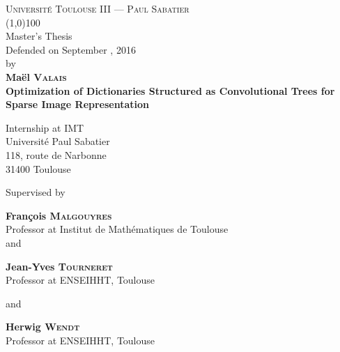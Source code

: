 \begin{titlepage}
\thispagestyle{titlepage}
\begin{center}
\textsc{Université Toulouse III — Paul Sabatier}\\
\vspace{0.5 cm}
\line(1,0){100}\\
\vspace{0.6 cm}
{{{Master's Thesis}}}\\
\vspace{0.3cm}
Defended on September , 2016\\ \vspace{0.3 cm} by\\ \vspace{0.3 cm} \textbf{Maël \textsc{Valais}}\\
\vfill
{\Huge \textbf{Optimization of Dictionaries Structured as Convolutional Trees for Sparse Image Representation}}\\
\vfill

{{Internship at \acs{IMT}}}\\
{Université Paul Sabatier}\\
{118, route de Narbonne}\\
{31400 Toulouse}\\
\vspace{2 cm}

\par Supervised by
\vspace{0.5cm}
\par \textbf{François \textsc{Malgouyres}}\\
Professor at Institut de Mathématiques de Toulouse\\ 

\vspace{0.2cm} and \vspace{0.2cm}

\textbf{Jean-Yves \textsc{Tourneret}}\\
Professor at ENSEIHHT, Toulouse

\vspace{0.2cm} and \vspace{0.2cm}

\textbf{Herwig \textsc{Wendt}}\\
Professor at ENSEIHHT, Toulouse

\vspace{1.5cm}
\end{center}
\end{titlepage}

\pagestyle{empty}
\restoregeometry

\tableofcontents


\pagestyle{body}
